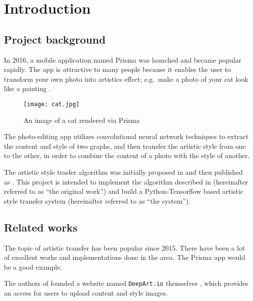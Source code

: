 
\chapter{Introduction}
\label{chap:intro}


\section{Project background}
\label{sec:intro:background}

In 2016, a mobile application named Prisma was launched \cite{wiki:prisma} and became popular rapidly.
The app is attractive to many people because it enables the user to transform your own photo
into artistics effect; e.g.\ make a photo of your cat look like a painting \cite{wiki:prisma}.

    \begin{figure}[!hbt]
    \center
    \texttt{[image: cat.jpg]}
    \caption{An image of a cat rendered via Prisma}
    \label{fig:prisma}
    \end{figure}

The photo-editing app utilizes convolutional neural network techniques to
extract the content and style of two graphs,
and then transfer the artistic style from one to the other,
in order to combine the content of a photo with the style of another.

The artistic style trasfer algorithm was initially proposed in \cite{Gatys:2015ub}
and then published as \cite{Gatys:2016gj}.
This project is intended to implement the algorithm described in \cite{Gatys:2016gj}
(hereinafter referred to as ``the original work'')
and build a Python-Tensorflow based artistic style transfer system
(hereinafter referred to as ``the system'').



\section{Related works}
\label{sec:intro:related}

The topic of artistic transfer has been popular since 2015.
There have been a lot of excellent works and implementations done in the area.
The Prisma app would be a good example.

The authors of \cite{Gatys:2016gj} founded a website named
\texttt{DeepArt.io} themselves \cite{wiki:deepart},
which provides an access for users to upload content and style images.

